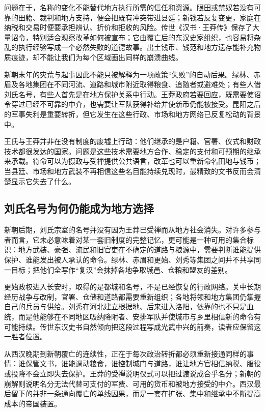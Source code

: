 问题在于，名称的变化不能替代地方执行所需的信任和资源。限田或禁奴若没有可靠的田籍、裁判和地方支持，便会把既有冲突带进县廷；新钱若反复变更，家庭在纳税和交易时便要承担辨认、折价和拒收的风险。传世《汉书·王莽传》保存了大量诏令，特别适合观察改革如何被宣布；它由覆亡后的东汉史家组织，也容易将杂乱的执行经验写成一个必然失败的道德故事。出土钱币、钱范和地方遗存能补充物质痕迹，却不能让我们为每个区域画出同样的崩溃曲线。

新朝末年的灾荒与起事因此不能只被解释为一项政策“失败”的自动后果。绿林、赤眉及各地集团在不同河流、道路和城市附近取得粮食、追随者或避难处；有些人借刘氏名号，有些人首先是在地方保护关系中行动。王莽政府若要回应，既需要使诏令穿过已经不可靠的中介，也需要让军队获得补给并使新币仍能被接受。昆阳之后的军事失利是重要转折，但它发生在这些行政、市场和地方网络已反复松动的背景中。

\begin{turningpoint}[晚西汉的簿册为何无法阻止过渡]
王氏与王莽并非在没有制度的废墟上行动：他们继承的是户籍、官署、仪式和财政技术都很发达的国家。问题是这些技术需要地方合作、稳定的支付和可预期的继承来承载。符命可以为摄政与受禅提供公共语言，改革也可以重新命名田地与钱币；当县廷、市场和地方武装不再相信这些名目能持续兑现时，最精致的文书反而会清楚显示它失去了什么。
\end{turningpoint}

\subsection{刘氏名号为何仍能成为地方选择}

新朝后期，刘氏宗室的名号并没有因为王莽已受禅而从地方社会消失。对许多参与者而言，它未必意味着对某一套旧制度的完整记忆，更可能是一种可用的集合标识：地方武装、豪强、流民和旧官吏在不确定的道路与粮源中，需要判断谁能提供保护、谁能发出被人承认的命令。绿林、赤眉和更始、刘秀等集团之间并不共享同一目标；把他们全写作“复汉”会抹掉各地争取城邑、仓粮和盟友的差别。

更始政权进入长安时，取得的是都城和名号，不是已经恢复的行政网络。关中长期经历战争与改制，官署、仓储和道路都需要重新组织；各地将领和地方集团仍掌握自己的兵员与供给。刘秀在河北建立根据地、后来进入洛阳，依靠的也不只是血统，而是他能够在不同地区吸纳降附者、安排军队并使城市与乡里相信新的命令有可能持续。传世东汉史书自然倾向把这段过程写成光武中兴的前奏，读者应保留这一胜者位置。

从西汉晚期到新朝覆亡的连续性，正在于每次政治转折都必须重新接通同样的事情：谁保管文书，谁能调动粮食，谁控制城门与道路，谁让地方官相信纳税、服役或投降不会立即失去保护。王莽的受禅说明仪式可以把过渡说成合乎名分；新朝的崩解则说明名分无法代替可支付的军费、可用的货币和被地方接受的中介。西汉最后留下的并非一条通向覆亡的单线因果，而是一套在扩张、集中和继承中不断提高成本的帝国装置。

